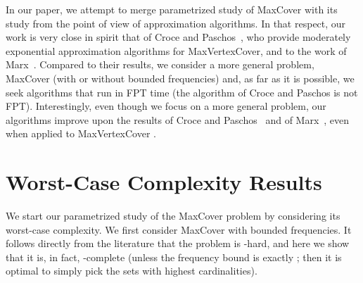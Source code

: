 \documentclass[11pt]{article}
\begin{document}
In our paper, we attempt to merge parametrized study of MaxCover with
its study from the point of view of approximation algorithms.  In that
respect, our work is very close in spirit that of Croce and
Paschos~\cite{cro-pas:j:cover}, who provide moderately exponential
approximation algorithms for MaxVertexCover, and to the work of
Marx~\cite{Marx06parameterizedcomplexity}.  Compared to their results,
we consider a more general problem, MaxCover (with or without bounded
frequencies) and, as far as it is possible, we seek algorithms that
run in FPT time (the algorithm of Croce and Paschos is not
FPT). Interestingly, even though we focus on a more general problem,
our algorithms improve upon the results of Croce and
Paschos~\cite{cro-pas:j:cover} and of
Marx~\cite{Marx06parameterizedcomplexity}, even when applied to
MaxVertexCover
.








\section{Worst-Case Complexity Results}\label{sec:worst-case}

We start our parametrized study of the MaxCover problem by
considering its worst-case complexity. We first consider MaxCover with
bounded frequencies. It follows directly from the literature that the
problem is -hard, and here we show that it is, in fact,
-complete (unless the frequency bound  is exactly ; then
it is optimal to simply pick the sets with highest cardinalities).
\end{document}
